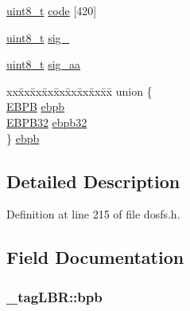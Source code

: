 \begin{DoxyCompactItemize}
\begin{tabbing}
\end{tabbing}\item 
\hyperlink{stdint_8h_aba7bc1797add20fe3efdf37ced1182c5}{uint8\-\_\-t} \hyperlink{struct__tag_l_b_r_a9b37ce11cb14157ded631ff935d17c94}{code} \mbox{[}420\mbox{]}
\item 
\hyperlink{stdint_8h_aba7bc1797add20fe3efdf37ced1182c5}{uint8\-\_\-t} \hyperlink{struct__tag_l_b_r_ac436541abd5f2d88777d476818be6e8b}{sig\-\_}
\item 
\hyperlink{stdint_8h_aba7bc1797add20fe3efdf37ced1182c5}{uint8\-\_\-t} \hyperlink{struct__tag_l_b_r_a29f47076e3080b467ae86ea92a5ca8e1}{sig\-\_\-aa}
\item 
\begin{tabbing}
xx\=xx\=xx\=xx\=xx\=xx\=xx\=xx\=xx\=\kill
union \{\\
\>\hyperlink{_common_2_libraries_2dosfs_2dosfs_8h_acce75b7d2a392a5262bc29026cf1d663}{EBPB} \hyperlink{struct__tag_l_b_r_a86d3372f818b659d2031640876756593}{ebpb}\\
\>\hyperlink{_common_2_libraries_2dosfs_2dosfs_8h_a32a707d601d48ab1403bb197255f54f3}{EBPB32} \hyperlink{struct__tag_l_b_r_a2998f055db7d2eb2020271037630d3d3}{ebpb32}\\
\} \hyperlink{struct__tag_l_b_r_a36f500a686f857a8207e41763a4021c9}{ebpb}\\

\end{tabbing}\end{DoxyCompactItemize}


\subsection{Detailed Description}


Definition at line 215 of file dosfs.\-h.



\subsection{Field Documentation}
\hypertarget{struct__tag_l_b_r_a018f4a41ea5bf12d345994ace8d7a50d}{
\subsubsection[{bpb}]{ \-\_\-tag\-L\-B\-R\-::bpb}}\label{struct__tag_l_b_r_a018f4a41ea5bf12d345994ace8d7a50d}


